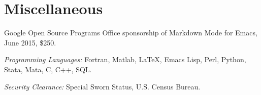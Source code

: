 \documentclass[10pt,letterpaper]{article}
\renewenvironment{itemize}{
  \begin{list}{}{
      \setlength{\leftmargin}{1.5em}
      \setlength{\itemsep}{0.25em}
      \setlength{\parskip}{0pt}
      \setlength{\parsep}{0.25em}
    }
}{
  \end{list}
}
\begin{document}
\section*{Miscellaneous}

\begin{itemize}
\item Google Open Source Programs Office sponsorship of Markdown Mode for Emacs, June 2015, \$250.
\item \textit{Programming Languages:} Fortran, Matlab, \LaTeX, Emacs Lisp, Perl, Python, Stata, Mata, C, C++, SQL.
\item \textit{Security Clearance:} Special Sworn Status, U.S. Census Bureau.
\end{itemize}
\end{document}
